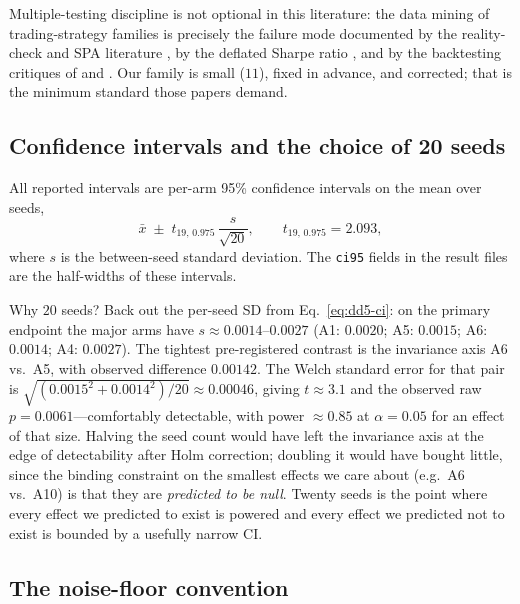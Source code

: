 \documentclass[11pt,a4paper]{article}
\theoremstyle{definition}
\theoremstyle{plain}
\begin{document}
Multiple-testing discipline is not optional in this literature: the data
mining of trading-strategy families is precisely the failure mode documented
by the reality-check and SPA literature
\citep{white2000reality,hansen2005spa}, by the deflated Sharpe ratio
\citep{bailey2014deflated}, and by the backtesting critiques of
\citet{harvey2016backtesting} and \citet{lopez2018advances}. Our family is
small ($11$), fixed in advance, and corrected; that is the minimum standard
those papers demand.

\subsection{Confidence intervals and the choice of 20 seeds}
\label{sec:dd5-ci}

All reported intervals are per-arm 95\% confidence intervals on the mean over
seeds,
\begin{equation}
\bar{x} \;\pm\; t_{19,\,0.975}\, \frac{s}{\sqrt{20}}, \qquad
t_{19,\,0.975} = 2.093,
\label{eq:dd5-ci}
\end{equation}
where $s$ is the between-seed standard deviation. The \texttt{ci95} fields in
the result files are the half-widths of these intervals.

Why $20$ seeds? Back out the per-seed SD from Eq.~\eqref{eq:dd5-ci}: on the
primary endpoint the major arms have $s \approx 0.0014$--$0.0027$ (A1:
$0.0020$; A5: $0.0015$; A6: $0.0014$; A4: $0.0027$). The tightest
pre-registered contrast is the invariance axis A6 vs.\ A5, with observed
difference $0.00142$. The Welch standard error for that pair is
$\sqrt{(0.0015^2 + 0.0014^2)/20} \approx 0.00046$, giving $t \approx 3.1$ and
the observed raw $p = 0.0061$---comfortably detectable, with power
$\approx 0.85$ at $\alpha = 0.05$ for an effect of that size. Halving the
seed count would have left the invariance axis at the edge of detectability
after Holm correction; doubling it would have bought little, since the
binding constraint on the smallest effects we care about (e.g.\ A6 vs.\ A10)
is that they are \emph{predicted to be null}. Twenty seeds is the point where
every effect we predicted to exist is powered and every effect we predicted
not to exist is bounded by a usefully narrow CI.

\subsection{The noise-floor convention}
\label{sec:dd5-floor}
\end{document}
